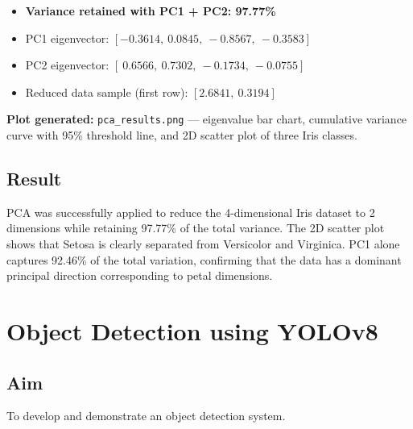 \documentclass[12pt,a4paper]{article}
\begin{document}
\begin{itemize}
  \item \textbf{Variance retained with PC1 + PC2: 97.77\%}
  \item PC1 eigenvector: $[-0.3614,\ 0.0845,\ -0.8567,\ -0.3583]$
  \item PC2 eigenvector: $[\ 0.6566,\ 0.7302,\ -0.1734,\ -0.0755]$
  \item Reduced data sample (first row): $[2.6841,\ 0.3194]$
\end{itemize}

\noindent \textbf{Plot generated:} \texttt{pca\_results.png} --- eigenvalue bar chart, cumulative
variance curve with 95\% threshold line, and 2D scatter plot of three Iris classes.

\subsection*{Result}
PCA was successfully applied to reduce the 4-dimensional Iris dataset to 2 dimensions while
retaining 97.77\% of the total variance. The 2D scatter plot shows that Setosa is clearly
separated from Versicolor and Virginica. PC1 alone captures 92.46\% of the total variation,
confirming that the data has a dominant principal direction corresponding to petal dimensions.

\newpage

\section{Object Detection using YOLOv8}

\subsection*{Aim}
To develop and demonstrate an object detection system.
\end{document}
